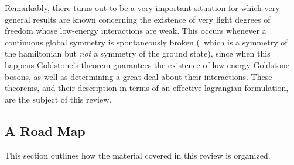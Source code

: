 Remarkably, there turns out to be a very important
situation for which very general results are known
concerning the existence of very light degrees of freedom
whose low-energy interactions are weak. This occurs
whenever a continuous global symmetry is spontaneously
broken (\ie\ which is a symmetry of the hamiltonian but
{\em not} a symmetry of the ground state), since when this
happens Goldstone's theorem guarantees the existence of
low-energy Goldstone bosons, as well as determining a great
deal about their interactions. These theorems, and their
description in terms of an effective lagrangian
formulation, are the subject of this review.

\subsection{A Road Map}

This section outlines how the material covered in this
review is organized.

